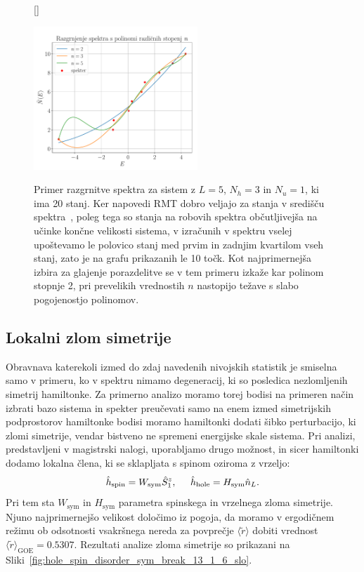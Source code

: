 \begin{figure}[H]
[\FBwidth]
{\caption{Primer razgrnitve spektra za sistem z $L=5$, $N_h=3$ in $N_u=1$, ki ima 20 stanj. Ker napovedi RMT dobro veljajo za stanja v središču spektra~\cite{d2016quantum}, poleg tega so stanja na robovih spektra občutljivejša na učinke končne velikosti sistema, v izračunih v spektru vselej upoštevamo le polovico stanj med prvim in zadnjim kvartilom vseh stanj, zato je na grafu prikazanih le 10 točk. Kot najprimernejša izbira za glajenje porazdelitve se v tem primeru izkaže kar polinom stopnje 2, pri prevelikih vrednostih $n$ nastopijo težave s slabo pogojenostjo polinomov. }\label{fig:unfolding_schematics}}
{\includegraphics[width=0.55\textwidth]{unfolding_schematics.pdf}}
\end{figure}
\subsection{Lokalni zlom simetrije}
Obravnava katerekoli izmed do zdaj navedenih nivojskih statistik je smiselna samo v primeru, ko v spektru nimamo degeneracij, ki so posledica nezlomljenih simetrij hamiltonke. Za primerno analizo moramo torej bodisi na primeren način izbrati bazo sistema in spekter preučevati samo na enem izmed simetrijskih podprostorov hamiltonke bodisi moramo hamiltonki dodati šibko perturbacijo, ki zlomi simetrije, vendar bistveno ne spremeni energijske skale sistema. Pri analizi, predstavljeni v magistrski nalogi, uporabljamo drugo možnost, in sicer hamiltonki dodamo lokalna člena, ki se sklapljata s spinom oziroma z vrzeljo:
\begin{equation}\label{eq:sym_break_terms}
\hat{h}_\mathrm{spin}=W_\mathrm{sym}\hat{S}_1^z, \hspace{5mm} \hat{h}_\mathrm{hole}=H_\mathrm{sym}\hat{n}_L.
\end{equation}
Pri tem sta $W_\mathrm{sym}$ in $H_\mathrm{sym}$ parametra spinskega in vrzelnega zloma simetrije. Njuno najprimernejšo velikost določimo iz pogoja, da moramo v ergodičnem režimu ob odsotnosti vsakršnega nereda za povprečje $\langle\tilde{r} \rangle$ dobiti vrednost $\langle\tilde{r}\rangle_\mathrm{GOE}=0.5307$. Rezultati analize zloma simetrije so prikazani na Sliki~\ref{fig:hole_spin_disorder_sym_break_13_1_6_slo}.

